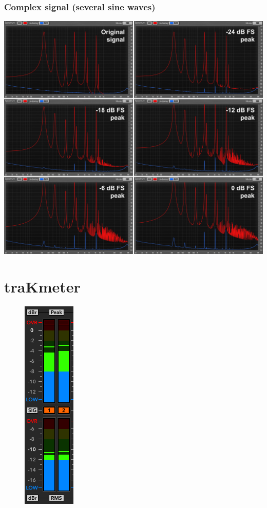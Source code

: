 \subsection{Complex signal (several sine waves)}

\includegraphics[scale=0.19,clip]{include/images/clipping_harmonics_ff800.png}

\chapter{traKmeter}
\label{chap:trakmeter}

\begin{figure}
  \includegraphics[scale=\screenshotscale,clip]{include/images/level_meter_complete.png}
\end{figure}


